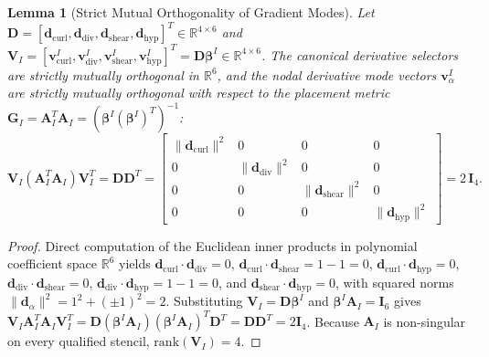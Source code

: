 \documentclass[preprint,12pt]{elsarticle}
\newtheorem{lemma}{Lemma}
\begin{document}
\begin{lemma}[Strict Mutual Orthogonality of Gradient Modes]
    Let $\mathbf{D} = [\mathbf{d}_{\mathrm{curl}}, \mathbf{d}_{\mathrm{div}}, \mathbf{d}_{\mathrm{shear}}, \mathbf{d}_{\mathrm{hyp}}]^T \in \mathbb{R}^{4 \times 6}$ and $\mathbf{V}_I = [\mathbf{v}_{\mathrm{curl}}^I, \mathbf{v}_{\mathrm{div}}^I, \mathbf{v}_{\mathrm{shear}}^I, \mathbf{v}_{\mathrm{hyp}}^I]^T = \mathbf{D} \boldsymbol{\beta}^I \in \mathbb{R}^{4 \times 6}$. The canonical derivative selectors are strictly mutually orthogonal in $\mathbb{R}^6$, and the nodal derivative mode vectors $\mathbf{v}_\alpha^I$ are strictly mutually orthogonal with respect to the placement metric $\mathbf{G}_I = \mathbf{A}_I^T \mathbf{A}_I = (\boldsymbol{\beta}^I (\boldsymbol{\beta}^I)^T)^{-1}$:
    \begin{equation}
        \mathbf{V}_I (\mathbf{A}_I^T \mathbf{A}_I) \mathbf{V}_I^T = \mathbf{D} \mathbf{D}^T =
        \begin{bmatrix}
            \|\mathbf{d}_{\mathrm{curl}}\|^2 & 0                               & 0                                 & 0                               \\
            0                                & \|\mathbf{d}_{\mathrm{div}}\|^2 & 0                                 & 0                               \\
            0                                & 0                               & \|\mathbf{d}_{\mathrm{shear}}\|^2 & 0                               \\
            0                                & 0                               & 0                                 & \|\mathbf{d}_{\mathrm{hyp}}\|^2
        \end{bmatrix}
        = 2 \, \mathbf{I}_4.
        \label{eq:orthogonality_gram_matrix}
    \end{equation}
\end{lemma}
\begin{proof}
    Direct computation of the Euclidean inner products in polynomial coefficient space $\mathbb{R}^6$ yields $\mathbf{d}_{\mathrm{curl}} \cdot \mathbf{d}_{\mathrm{div}} = 0$, $\mathbf{d}_{\mathrm{curl}} \cdot \mathbf{d}_{\mathrm{shear}} = 1 - 1 = 0$, $\mathbf{d}_{\mathrm{curl}} \cdot \mathbf{d}_{\mathrm{hyp}} = 0$, $\mathbf{d}_{\mathrm{div}} \cdot \mathbf{d}_{\mathrm{shear}} = 0$, $\mathbf{d}_{\mathrm{div}} \cdot \mathbf{d}_{\mathrm{hyp}} = 1 - 1 = 0$, and $\mathbf{d}_{\mathrm{shear}} \cdot \mathbf{d}_{\mathrm{hyp}} = 0$, with squared norms $\|\mathbf{d}_\alpha\|^2 = 1^2 + (\pm 1)^2 = 2$. Substituting $\mathbf{V}_I = \mathbf{D}\boldsymbol{\beta}^I$ and $\boldsymbol{\beta}^I \mathbf{A}_I = \mathbf{I}_6$ gives $\mathbf{V}_I \mathbf{A}_I^T \mathbf{A}_I \mathbf{V}_I^T = \mathbf{D}(\boldsymbol{\beta}^I \mathbf{A}_I)(\boldsymbol{\beta}^I \mathbf{A}_I)^T \mathbf{D}^T = \mathbf{D}\mathbf{D}^T = 2\mathbf{I}_4$. Because $\mathbf{A}_I$ is non-singular on every qualified stencil, $\mathrm{rank}(\mathbf{V}_I) = 4$.
\end{proof}
\end{document}
